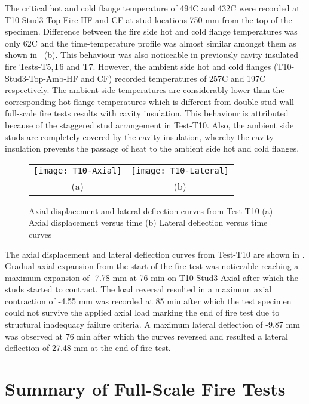 The critical hot and cold flange temperature of 494\degree C and 432\degree C were recorded at T10-Stud3-Top-Fire-HF and CF at stud locations 750 mm from the top of the specimen. Difference between the fire side hot and cold flange temperatures was only 62\degree C and the time-temperature profile was almost similar amongst them as shown in ~(b). This behaviour was also noticeable in previously cavity insulated fire Tests-T5,T6 and T7. However, the ambient side hot and cold flanges (T10-Stud3-Top-Amb-HF and CF) recorded temperatures of 257\degree C and 197\degree C respectively. The ambient side temperatures are considerably lower than the corresponding hot flange temperatures which is different from double stud wall full-scale fire tests results with cavity insulation. This behaviour is attributed because of the staggered stud arrangement in Test-T10. Also, the ambient side studs are completely covered by the cavity insulation, whereby the cavity insulation prevents the passage of heat to the ambient side hot and cold flanges.   
\begin{figure}[!htbp]
	\centering
		\begin{tabular}{cc}
			\texttt{[image: T10-Axial]} & \texttt{[image: T10-Lateral]} \\ 
			(a) & (b) \\ 
		\end{tabular} 
		\caption{Axial displacement and lateral deflection curves from Test-T10 (a) Axial displacement versus time (b) Lateral deflection versus time curves}
		\label{fig:T10-displacement}
\end{figure}

The axial displacement and lateral deflection curves from Test-T10 are shown in . Gradual axial expansion from the start of the fire test was noticeable reaching a maximum expansion of -7.78 mm at 76 min on T10-Stud3-Axial after which the studs started to contract. The load reversal resulted in a maximum axial contraction of -4.55 mm was recorded at 85 min after which the test specimen could not survive the applied axial load marking the end of fire test due to structural inadequacy failure criteria. A maximum lateral deflection of -9.87 mm was observed at 76 min after which the curves reversed and resulted a lateral deflection of 27.48 mm at the end of fire test.

\section{Summary of Full-Scale Fire Tests}

